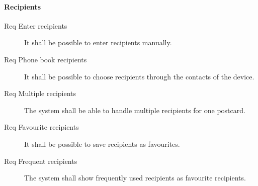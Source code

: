 \documentclass[10pt,a4paper]{article}
\begin{document}
\paragraph{Recipients}
\begin{description}
	\item [Req  Enter recipients] It shall be possible to enter recipients manually.
	\item [Req  Phone book recipients] It shall be possible to choose recipients through the contacts of the device.
	\item [Req  Multiple recipients] The system shall be able to handle multiple recipients for one postcard.
	\item [Req  Favourite recipients] It shall be possible to save recipients as favourites.
	\item [Req  Frequent recipients] The system shall show frequently used recipients as favourite recipients.
\end{description}
\end{document}
